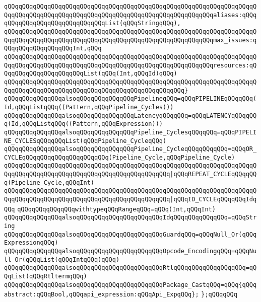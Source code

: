 \verb|qQQqqQQqqQQqqQQqqQQqqQQqqQQqqQQqqQQqqQQqqQQqqQQqqQQqqQQqqQQqqQQqqQQqqQQqqQQqqQQqqQQqqQQqqQQqqQQqqQQqqQQqqQQqqQQqqQQqqQQqqQQqqQQqaliases:qQQqqQQqqQQqqQQqqQQqqQQqqQQqqQQqList(qQQqStringqQQq),|\newline
\verb|qQQqqQQqqQQqqQQqqQQqqQQqqQQqqQQqqQQqqQQqqQQqqQQqqQQqqQQqqQQqqQQqqQQqqQQqqQQqqQQqqQQqqQQqqQQqqQQqqQQqqQQqqQQqqQQqqQQqqQQqqQQqqQQqmax_issues:qQQqqQQqqQQqqQQqqQQqInt,qQQq|\newline
\verb|qQQqqQQqqQQqqQQqqQQqqQQqqQQqqQQqqQQqqQQqqQQqqQQqqQQqqQQqqQQqqQQqqQQqqQQqqQQqqQQqqQQqqQQqqQQqqQQqqQQqqQQqqQQqqQQqqQQqqQQqqQQqqQQqresources:qQQqqQQqqQQqqQQqqQQqqQQqList(qQQq(Int,qQQqId)qQQq)|\newline
\verb|qQQqqQQqqQQqqQQqqQQqqQQqqQQqqQQqqQQqqQQqqQQqqQQqqQQqqQQqqQQqqQQqqQQqqQQqqQQqqQQqqQQqqQQqqQQqqQQqqQQqqQQqqQQqqQQqqQQqqQQq}|\newline
\newline
\verb|qQQqqQQqqQQqqQQqalsoqQQqqQQqqQQqqQQqPipelineqQQq=qQQqPIPELINEqQQqqQQq(Id,qQQqListqQQq((Pattern,qQQqPipeline_Cycles)))|\newline
\newline
\verb|qQQqqQQqqQQqqQQqalsoqQQqqQQqqQQqqQQqLatencyqQQqqQQq=qQQqLATENCYqQQqqQQq(Id,qQQqListqQQq((Pattern,qQQqExpression)))|\newline
\newline
\verb|qQQqqQQqqQQqqQQqalsoqQQqqQQqqQQqqQQqPipeline_CyclesqQQqqQQq=qQQqPIPELINE_CYCLESqQQqqQQqList(qQQqPipeline_CycleqQQq)|\newline
\newline
\verb|qQQqqQQqqQQqqQQqalsoqQQqqQQqqQQqqQQqPipeline_CycleqQQqqQQqqQQq=qQQqOR_CYCLEqQQqqQQqqQQqqQQqqQQqqQQq(Pipeline_Cycle,qQQqPipeline_Cycle)|\newline
\verb|qQQqqQQqqQQqqQQqqQQqqQQqqQQqqQQqqQQqqQQqqQQqqQQqqQQqqQQqqQQqqQQqqQQqqQQqqQQqqQQqqQQqqQQqqQQqqQQqqQQqqQQqqQQqqQQqqQQq|\verb#|qQQqREPEAT_CYCLEqQQqqQQq(Pipeline_Cycle,qQQqInt)#\newline
\verb|qQQqqQQqqQQqqQQqqQQqqQQqqQQqqQQqqQQqqQQqqQQqqQQqqQQqqQQqqQQqqQQqqQQqqQQqqQQqqQQqqQQqqQQqqQQqqQQqqQQqqQQqqQQqqQQqqQQq|\verb#|qQQqID_CYCLEqQQqqQQqIdqQQq#\newline
\newline
\newline
\verb|qQQqqQQqqQQqqQQqwithtypeqQQqRangeqQQq=qQQq(Int,qQQqInt)|\newline
\verb|qQQqqQQqqQQqqQQqalsoqQQqqQQqqQQqqQQqqQQqqQQqIdqQQqqQQqqQQqqQQq=qQQqString|\newline
\verb|qQQqqQQqqQQqqQQqalsoqQQqqQQqqQQqqQQqqQQqqQQqGuardqQQq=qQQqNull_Or(qQQqExpressionqQQq)|\newline
\verb|qQQqqQQqqQQqqQQqalsoqQQqqQQqqQQqqQQqqQQqqQQqOpcode_EncodingqQQq=qQQqNull_Or(qQQqList(qQQqIntqQQq)qQQq)|\newline
\verb|qQQqqQQqqQQqqQQqalsoqQQqqQQqqQQqqQQqqQQqqQQqRtlqQQqqQQqqQQqqQQqqQQq=qQQqList(qQQqRtltermqQQq)|\newline
\verb|qQQqqQQqqQQqqQQqalsoqQQqqQQqqQQqqQQqqQQqqQQqPackage_CastqQQq=qQQq{qQQqabstract:qQQqBool,qQQqapi_expression:qQQqApi_ExpqQQq};|\newline
\newline
\verb|};qQQqqQQq|\newline
\newline

